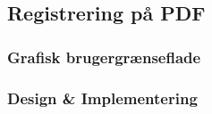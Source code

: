 \subsection{Registrering på PDF}

\subsubsection{Grafisk brugergrænseflade}

\subsubsection{Design \& Implementering}
